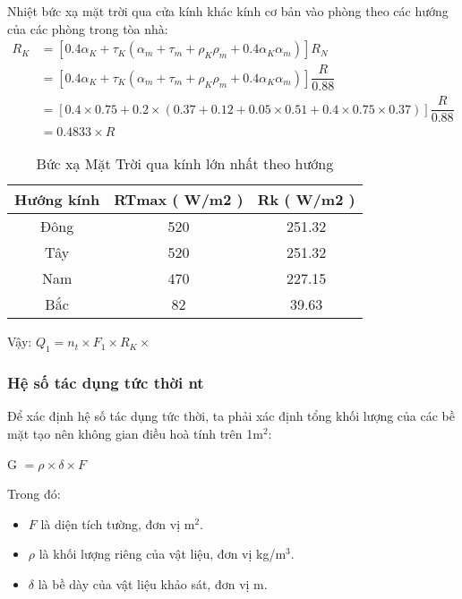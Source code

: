 Nhiệt bức xạ mặt trời qua cửa kính khác kính cơ bản vào phòng theo các hướng của các phòng trong tòa nhà:
\begin{equation*}
	\begin{split}
		R_{K} &= [0.4\alpha_{K} + \tau_{K}(\alpha_{m} + \tau_{m} + \rho_{K}\rho_{m} + 0.4\alpha_{K}\alpha_{m})]R_{N} \\
		&= [0.4\alpha_{K} + \tau_{K}(\alpha_{m} + \tau_{m} + \rho_{K}\rho_{m} + 0.4\alpha_{K}\alpha_{m})]\dfrac{R}{0.88} \\
		&= [0.4\times0.75 + 0.2\times(0.37 + 0.12 + 0.05\times0.51 + 0.4\times0.75\times0.37)]\dfrac{R}{0.88} \\
		&= 0.4833\times R
	\end{split}
\end{equation*}
\begin{table}[H]
	\vspace{-0.3cm}
	\centering
	\caption{Bức xạ Mặt Trời qua kính lớn nhất theo hướng}
	\begin{tabular}{|c|c|c|}
		\hline
		\textbf{Hướng kính} & \textbf{RTmax ( W/m2 )} & \textbf{Rk ( W/m2 )} \bigstrut\\
		\hline
		Đông  & 520   & 251.32 \bigstrut\\
		\hline
		Tây   & 520   & 251.32 \bigstrut\\
		\hline
		Nam   & 470   & 227.15 \bigstrut\\
		\hline
		Bắc   & 82    & 39.63 \bigstrut\\
		\hline
	\end{tabular}
	\label{b:bxmtln}
\end{table}
Vậy: $Q_{1} = n_{t}\times F_{1}\times R_{K}\times $

\subsubsection{Hệ số tác dụng tức thời n{\scriptsize t}}
Để xác định hệ số tác dụng tức thời, ta phải xác định tổng khối lượng của các bề mặt tạo nên không gian điều hoà tính trên 1m$^2$:

\begin{center}
	G $= \rho \times \delta \times F$
\end{center}

Trong đó:
\begin{itemize}[leftmargin = 2.2cm]
	\item $F$ là diện tích tường, đơn vị m$^2$.
	\item $\rho$ là khối lượng riêng của vật liệu, đơn vị kg/m$^3$.
	\item $\delta$ là bề dày của vật liệu khảo sát, đơn vị m.
\end{itemize}

